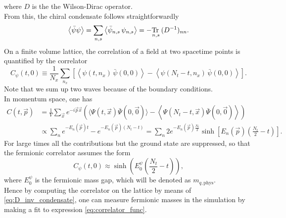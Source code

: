 where $D$ is the the Wilson-Dirac operator. \\
From this, the chiral condensate follows straightforwardly
\begin{equation*}
    \left\langle  \bar\psi \psi \right\rangle = \underset{n,s}\sum  \left\langle \bar\psi_{n,s} \, \psi_{n,s} \right\rangle = -\underset{n,s}{\operatorname{\text{Tr} \,}} \, (D^{-1})_{nn}.
\end{equation*}
On a finite volume lattice, the correlation of a field at two spacetime points is quantified by the correlator
\begin{equation}
    C_\psi(t,0) \equiv \frac{1}{N_x} \sum_{n_x} \left[\left\langle \psi(t, n_x) \, \bar\psi(0,0)\right\rangle - \left\langle \psi(N_t-t, n_x) \, \bar\psi(0,0)\right\rangle \right] .
    \label{eq:correlator_definition}
\end{equation}
Note that we sum up two waves because of the boundary conditions. \\
In momentum space, one has
\begin{equation*} 
    \begin{aligned}
        C(t, \vec{p}) & =\frac{1}{V} \sum_{\vec{x}} e^{-i \vec{p} \vec{x}}\left(\langle\Psi(t, \vec{x}) \bar{\Psi}(0, \vec{0})\rangle-\left\langle\Psi\left(N_t-t, \vec{x}\right) \bar{\Psi}(0, \vec{0})\right\rangle\right) \\
        & \propto \sum_n e^{-E_n(\vec{p}) t}-e^{-E_n(\vec{p})\left(N_t-t\right)}=\sum_n 2 e^{-E_n(\vec{p}) \frac{N_t}{2}} \sinh \left[E_n(\vec{p})\left(\frac{N_t}{2}-t\right)\right] .
    \end{aligned}
\end{equation*}
For large times all the contributions but the ground state are suppressed, so that 
the fermionic correlator assumes the form 
\begin{equation}
    C_\psi(t,0) \approx \sinh \left(E_0^{\psi} \left(\frac{N_t}{2} - t\right)\right),
    \label{eq:correlator_func}
\end{equation}
where $E_0^{\psi}$ is the fermionic mass gap, which will be denoted as $m_{q,\text{phys}}$. \\
Hence by computing the correlator on the lattice by means of \eqref{eq:D_inv_condensate}, one can measure fermionic masses in the simulation by making a fit to expression \eqref{eq:correlator_func}. \\
